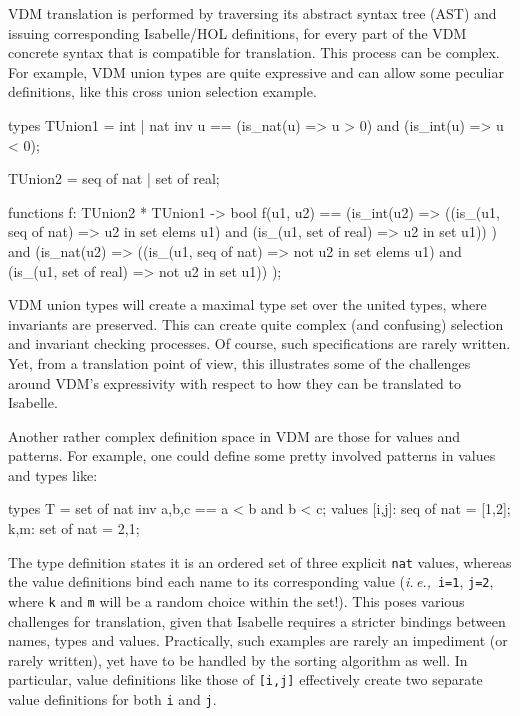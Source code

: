 \documentclass[runningheads,a4paper]{llncs}
\newcommand{\ie}{{\em i.\,e.,\/}}
\begin{document}
VDM translation is performed by traversing its abstract syntax tree (AST) and issuing corresponding Isabelle/HOL definitions, for every part of the VDM concrete syntax that is compatible for translation. This process can be complex. For example, VDM union types are quite expressive and can allow some peculiar definitions, like this cross union selection example.
%
\begin{vdmsl}[frame=none,basicstyle=\ttfamily\scriptsize]
    types
        TUnion1 = int | nat
        inv u == (is_nat(u) => u > 0) and (is_int(u) => u < 0);

        TUnion2 = seq of nat | set of real;

    functions 
        f: TUnion2 * TUnion1 -> bool
        f(u1, u2) ==
            (is_int(u2) => 
                ((is_(u1, seq of nat) => u2 in set elems u1)
                  and
                 (is_(u1, set of real) => u2 in set u1))
            )
            and
            (is_nat(u2) => 
                ((is_(u1, seq of nat) => not u2 in set elems u1)
                  and
                 (is_(u1, set of real) => not u2 in set u1))
            );
\end{vdmsl}
%
VDM union types will create a maximal type set over the united types, where invariants are preserved. This can create quite complex (and confusing) selection and invariant checking processes. Of course, such specifications are rarely written. Yet, from a translation point of view, this illustrates some of the challenges around VDM's expressivity with respect to how they can be translated to Isabelle. 

Another rather complex definition space in VDM are those for values and patterns. For example, one could define some pretty involved patterns in values and types like:
%
\begin{vdmsl}[frame=none,basicstyle=\ttfamily\scriptsize]
    types
        T = set of nat inv {a,b,c} == a < b and b < c;
    values 
        [i,j]: seq of nat = [1,2];
        {k,m}: set of nat = {2,1};
\end{vdmsl}
%
The type definition states it is an ordered set of three explicit \verb'nat' values, whereas the value definitions bind each name to its corresponding value (\ie~\verb'i=1', \verb'j=2', where \verb'k' and \verb'm' will be a random choice within the set!). This poses various challenges for translation, given that Isabelle requires a stricter bindings between names, types and values. Practically, such examples are rarely an impediment (or rarely written), yet have to be handled by the sorting algorithm as well. In particular, value definitions like those of \verb'[i,j]' effectively create two separate value definitions for both \verb'i' and \verb'j'.   
\end{document}

